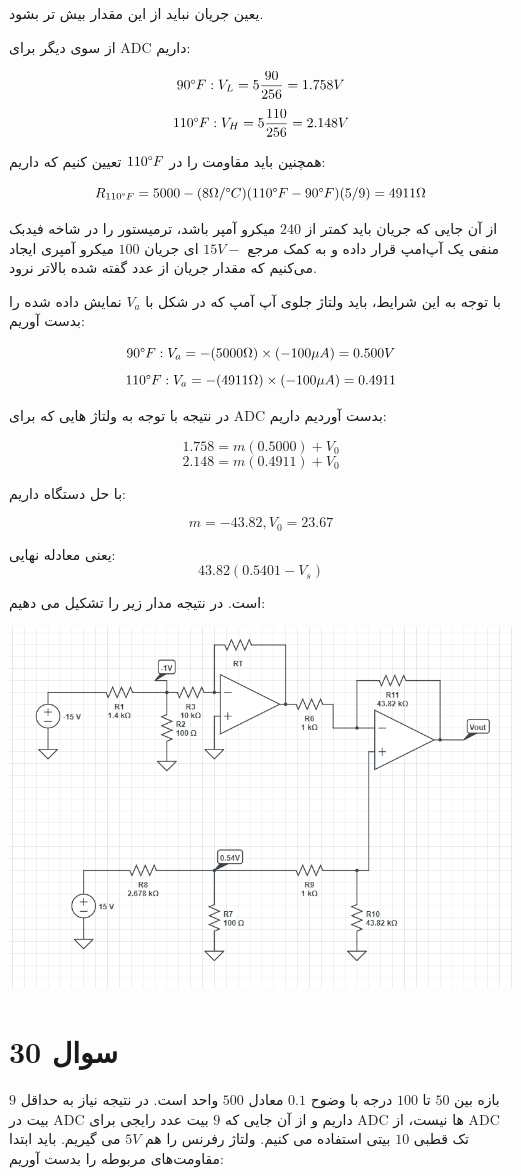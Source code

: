 \documentclass[12pt]{article}
\begin{document}
یعین جریان نباید از این مقدار بیش تر بشود.


از سوی دیگر برای ADC داریم:

$$90 \degree F: V_L = 5 \frac{90}{256} = 1.758V $$
$$110 \degree F: V_H = 5 \frac{110}{256} = 2.148 V$$

همچنین باید مقاومت را در $110\degree F$ تعیین کنیم که داریم:

$$R_{110 \degree F} = 5000 - (8 \Omega / \degree C)(110 \degree F - 90\degree F)(5/9) = 4911 \Omega$$

از آن جایی که جریان باید کمتر از $240$ میکرو آمپر باشد، ترمیستور را در شاخه فیدبک منفی یک آپ‌امپ قرار داده و به کمک مرجع $15V-$ ای جریان $100$ میکرو آمپری ایجاد می‌کنیم که مقدار جریان از عدد گفته شده بالاتر نرود.

با توجه به این شرایط، باید ولتاژ جلوی آپ آمپ که در شکل با $V_a$ نمایش داده شده را بدست آوریم:

$$90 \degree F: V_a = -(5000 \Omega) \times (- 100 \mu A) = 0.500 V$$
$$110 \degree F: V_a = -(4911 \Omega) \times (-100 \mu A) = 0.4911$$

در نتیجه با توجه به ولتاژ هایی که برای ADC بدست آوردیم داریم:

$$1.758 = m(0.5000) + V_0$$
$$2.148 = m (0.4911) + V_0$$

با حل دستگاه داریم:

$$m = -43.82 , V_0 = 23.67$$

یعنی معادله نهایی:
$$43.82(0.5401 - V_s)$$

است. در نتیجه مدار زیر را تشکیل می دهیم:




\begin{center}
	\includegraphics[width = 0.5 \textwidth]{images/7.png}
\end{center}

\newpage 
\section{سوال 30}

بازه بین $50$ تا $100$ درجه با وضوح $0.1$ معادل $500$ واحد است. در نتیجه نیاز به حداقل $9$ بیت در ADC داریم و از آن جایی که $9$ بیت عدد رایجی برای ADC ها نیست، از ADC تک قطبی $10$ بیتی استفاده می کنیم. ولتاژ رفرنس را هم $5V$ می گیریم.  باید ابتدا مقاومت‌های مربوطه را بدست آوریم:
\end{document}
